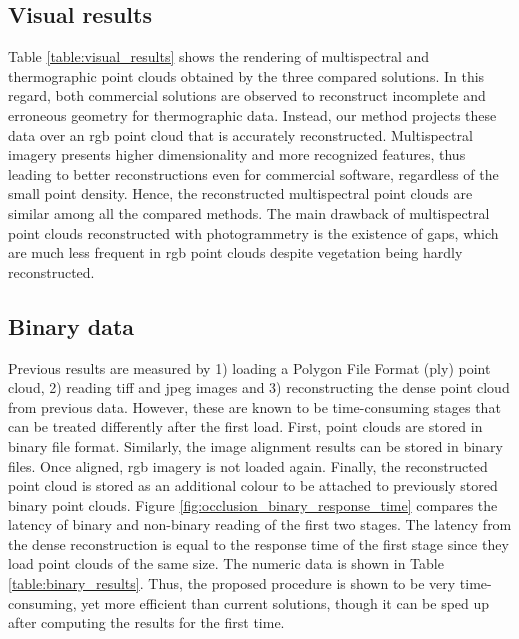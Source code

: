 \subsection{Visual results}

Table \ref{table:visual_results} shows the rendering of multispectral and thermographic point clouds obtained by the three compared solutions. In this regard, both commercial solutions are observed to reconstruct incomplete and erroneous geometry for thermographic data. Instead, our method projects these data over an \acrshort{rgb} point cloud that is accurately reconstructed. Multispectral imagery presents higher dimensionality and more recognized features, thus leading to better reconstructions even for commercial software, regardless of the small point density. Hence, the reconstructed multispectral point clouds are similar among all the compared methods. The main drawback of multispectral point clouds reconstructed with photogrammetry is the existence of gaps, which are much less frequent in \acrshort{rgb} point clouds despite vegetation being hardly reconstructed. 

\subsection{Binary data}

Previous results are measured by 1) loading a Polygon File Format (\acrshort{ply}) point cloud, 2) reading \acrshort{tiff} and \acrshort{jpeg} images and 3) reconstructing the dense point cloud from previous data. However, these are known to be time-consuming stages that can be treated differently after the first load. First, point clouds are stored in binary file format. Similarly, the image alignment results can be stored in binary files. Once aligned, \acrshort{rgb} imagery is not loaded again. Finally, the reconstructed point cloud is stored as an additional colour to be attached to previously stored binary point clouds. Figure \ref{fig:occlusion_binary_response_time} compares the latency of binary and non-binary reading of the first two stages. The latency from the dense reconstruction is equal to the response time of the first stage since they load point clouds of the same size. The numeric data is shown in Table \ref{table:binary_results}. Thus, the proposed procedure is shown to be very time-consuming, yet more efficient than current solutions, though it can be sped up after computing the results for the first time.

